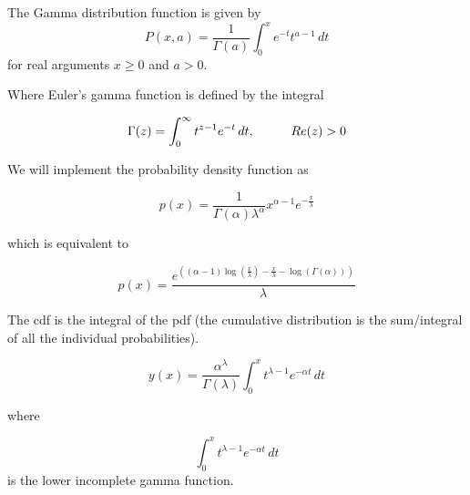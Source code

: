The Gamma distribution function is given by
$$ P(x,a) = \frac{1}{\Gamma(a)} \int_0^x e^{-t} t^{a-1} \,dt $$
for real arguments $x \geq 0$ and $a > 0$.

Where Euler's gamma function is defined by the integral

$$ \Gamma(z) = \int_0^\infty t^{z-1} e^{-t} \,dt, \hspace{10mm} Re(z) > 0 $$


We will implement the probability density function as

$$ p(x) = \frac{1}{\Gamma(\alpha) \lambda^\alpha} x^{\alpha-1} e^{-\frac{x}{\lambda}} $$

which is equivalent to

$$ p(x) = \frac{ e^{\left( (\alpha - 1) \log \left( \frac{x}{\lambda} \right) - \frac{x}{\lambda} - \log \left( \Gamma(\alpha) \right) \right) }}{\lambda} $$


The cdf is the integral of the pdf (the cumulative distribution is the sum/integral of all the individual probabilities).

$$ y(x) = \frac{\alpha^\lambda}{\Gamma(\lambda)} \int_0^x t^{\lambda-1} e^{-\alpha t} \,dt $$

where

$$ \int_0^x t^{\lambda-1} e^{-\alpha t} \,dt $$ is the lower incomplete gamma function.

